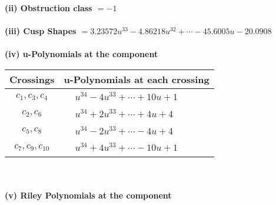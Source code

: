 \documentclass[1p]{elsarticle_modified}
\theoremstyle{definition}
\begin{document}
\flushleft \textbf{(ii) Obstruction class $= -1$}\\~\\
\flushleft \textbf{(iii) Cusp Shapes $= 3.23572 u^{33}-4.86218 u^{32}+\cdots-45.6005 u-20.0908$}\\~\\
\newpage\renewcommand{\arraystretch}{1}
\flushleft \textbf{(iv) u-Polynomials at the component}\newline \\
\begin{tabular}{m{50pt}|m{274pt}}
Crossings & \hspace{64pt}u-Polynomials at each crossing \\
\hline $$\begin{aligned}c_{1},c_{3},c_{4}\end{aligned}$$&$\begin{aligned}
&u^{34}-4 u^{33}+\cdots+10 u+1
\end{aligned}$\\
\hline $$\begin{aligned}c_{2},c_{6}\end{aligned}$$&$\begin{aligned}
&u^{34}+2 u^{33}+\cdots+4 u+4
\end{aligned}$\\
\hline $$\begin{aligned}c_{5},c_{8}\end{aligned}$$&$\begin{aligned}
&u^{34}-2 u^{33}+\cdots-4 u+4
\end{aligned}$\\
\hline $$\begin{aligned}c_{7},c_{9},c_{10}\end{aligned}$$&$\begin{aligned}
&u^{34}+4 u^{33}+\cdots-10 u+1
\end{aligned}$\\
\hline
\end{tabular}\\~\\
\newpage\renewcommand{\arraystretch}{1}
\flushleft \textbf{(v) Riley Polynomials at the component}\newline \\
\end{document}
